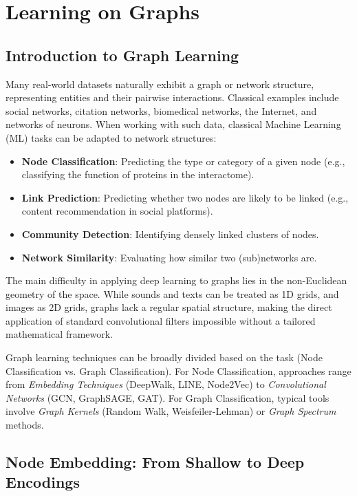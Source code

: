 \chapter{Learning on Graphs}
\label{ch:learning_on_graphs}

\section{Introduction to Graph Learning}
Many real-world datasets naturally exhibit a graph or network structure, representing entities and their pairwise interactions. Classical examples include social networks, citation networks, biomedical networks, the Internet, and networks of neurons. 
When working with such data, classical Machine Learning (ML) tasks can be adapted to network structures:
\begin{itemize}
    \item \textbf{Node Classification}: Predicting the type or category of a given node (e.g., classifying the function of proteins in the interactome).
    \item \textbf{Link Prediction}: Predicting whether two nodes are likely to be linked (e.g., content recommendation in social platforms).
    \item \textbf{Community Detection}: Identifying densely linked clusters of nodes.
    \item \textbf{Network Similarity}: Evaluating how similar two (sub)networks are.
\end{itemize}

The main difficulty in applying deep learning to graphs lies in the non-Euclidean geometry of the space. While sounds and texts can be treated as 1D grids, and images as 2D grids, graphs lack a regular spatial structure, making the direct application of standard convolutional filters impossible without a tailored mathematical framework.

\begin{insightbox}
Graph learning techniques can be broadly divided based on the task (Node Classification vs. Graph Classification). For Node Classification, approaches range from \textit{Embedding Techniques} (DeepWalk, LINE, Node2Vec) to \textit{Convolutional Networks} (GCN, GraphSAGE, GAT). For Graph Classification, typical tools involve \textit{Graph Kernels} (Random Walk, Weisfeiler-Lehman) or \textit{Graph Spectrum} methods.
\end{insightbox}

\section{Node Embedding: From Shallow to Deep Encodings}

